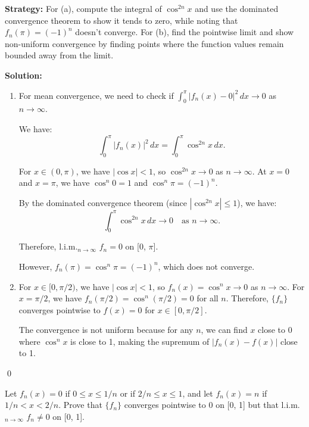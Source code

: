 \noindent\textbf{Strategy:} For (a), compute the integral of \( \cos^{2n} x \) and use the dominated convergence theorem to show it tends to zero, while noting that \( f_n(\pi) = (-1)^n \) doesn't converge. For (b), find the pointwise limit and show non-uniform convergence by finding points where the function values remain bounded away from the limit.

\bigskip\noindent\textbf{Solution:}
\begin{enumerate}[label=(\alph*)]
\item For mean convergence, we need to check if \( \int_0^\pi |f_n(x) - 0|^2 \, dx \to 0 \) as \( n \to \infty \).

We have:
\[\int_0^\pi |f_n(x)|^2 \, dx = \int_0^\pi \cos^{2n} x \, dx.\]

For \( x \in (0, \pi) \), we have \( |\cos x| < 1 \), so \( \cos^{2n} x \to 0 \) as \( n \to \infty \). At \( x = 0 \) and \( x = \pi \), we have \( \cos^n 0 = 1 \) and \( \cos^n \pi = (-1)^n \).

By the dominated convergence theorem (since \( |\cos^{2n} x| \leq 1 \)), we have:
\[\int_0^\pi \cos^{2n} x \, dx \to 0 \quad \text{as } n \to \infty.\]

Therefore, l.i.m.\(_{n\to\infty}\) \( f_n = 0 \) on [0, \(\pi\)].

However, \( f_n(\pi) = \cos^n \pi = (-1)^n \), which does not converge.

\item For \( x \in [0, \pi/2) \), we have \( |\cos x| < 1 \), so \( f_n(x) = \cos^n x \to 0 \) as \( n \to \infty \). For \( x = \pi/2 \), we have \( f_n(\pi/2) = \cos^n(\pi/2) = 0 \) for all \( n \). Therefore, \( \{f_n\} \) converges pointwise to \( f(x) = 0 \) for \( x \in [0, \pi/2] \).

The convergence is not uniform because for any \( n \), we can find \( x \) close to 0 where \( \cos^n x \) is close to 1, making the supremum of \( |f_n(x) - f(x)| \) close to 1.
\end{enumerate}\qed


\begin{problembox}
\begin{problemstatement}
Let \( f_n(x) = 0 \) if \( 0 \leq x \leq 1/n \) or if \( 2/n \leq x \leq 1 \), and let \( f_n(x) = n \) if \( 1/n < x < 2/n \). Prove that \( \{f_n\} \) converges pointwise to 0 on [0, 1] but that l.i.m.\(_{n\to\infty}\) \( f_n \neq 0 \) on [0, 1].
\end{problemstatement}
\end{problembox}

